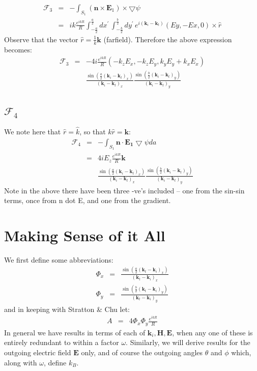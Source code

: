 \documentclass[a4article,12pt]{article}
\newcommand{\kvec}[0]{{\mathbf k}}
\newcommand{\Hvec}[0]{{\mathbf H}}
\newcommand{\Evec}[0]{{\mathbf E}}
\begin{document}
\begin{eqnarray}
{\mathcal F}_3 & = & - \int_{S_1} (\mathbf{n} \times \mathbf{E}_1) \times \bigtriangledown \psi \\
& = & i k \frac{e^{i k R}}{R} \int_{-\frac{a}{2}}^{\frac{a}{2}} dx^{\prime} \, \int_{-\frac{b}{2}}^{\frac{b}{2}} dy^{\prime} \, e^{i (\kvec_i-\kvec_t)} (Ey, -Ex, 0) \times \hat{r}
\end{eqnarray}
%
Observe that the vector $\hat{r} = \frac{1}{k} \kvec$ (farfield). Therefore the above expression becomes:
%
\begin{eqnarray}
{\mathcal F}_3  & = &  - 4 i \frac{e^{i k R}}{R} (-k_z E_x, -k_z E_y, k_y E_y + k_x E_x) \nonumber \\
&& \frac{\sin \left( \frac{a}{2} (\kvec_i - \kvec_t )_x \right)}{( \kvec_i - \kvec_t )_x} \frac{\sin \left( \frac{b}{2}( \kvec_i - \kvec_t )_y \right)}{( \kvec_i - \kvec_t )_y}  \\
\end{eqnarray}

\subsection{${\mathcal F}_4$}

We note here that $\hat{r} = \hat{k}$, so that $k \hat{r} = \kvec$:
%
\begin{eqnarray}
{\mathcal F}_4 & = &  - \int_{S_1} \mathbf{n} \cdot \mathbf{E_1} \bigtriangledown \psi da \\
& = & 4 i E_z \frac{e^{i k R}}{R} \kvec \nonumber \\
&& \frac{\sin \left( \frac{a}{2} (\kvec_i - \kvec_t )_x \right)}{( \kvec_i - \kvec_t )_x} \frac{\sin \left(\frac{b}{2}( \kvec_i - \kvec_t )_y \right)}{( \kvec_i - \kvec_t )_y}
\end{eqnarray}
%
Note in the above there have been three -ve's included -- one from the sin-sin terms, once from n dot E, and one from the gradient.

\section{Making Sense of it All}

We first define some abbreviations:
%
\begin{eqnarray}
\Phi_x  & = & \frac{\sin \left( \frac{a}{2} (\kvec_t - \kvec_i )_x \right)}{(\kvec_t - \kvec_i )_x} \\
\Phi_y & = & \frac{\sin \left( \frac{b}{2}( \kvec_t - \kvec_i )_y \right)}{(\kvec_t - \kvec_i )_y}
\end{eqnarray}
%
and in keeping with Stratton \& Chu let:
%
\begin{eqnarray}
A & = & 4 \Phi_x \Phi_y \frac{e^{i k R}}{R}
\end{eqnarray}
%
In general we have results in terms of each of $\kvec_i, \Hvec, \Evec$, when any one of these is entirely redundant to within a factor $\omega$. Similarly, we will derive results for the outgoing electric field $\Evec$ only, and of course the outgoing angles $\theta$ and $\phi$ which, along with $\omega$, define $k_B$.
\end{document}
